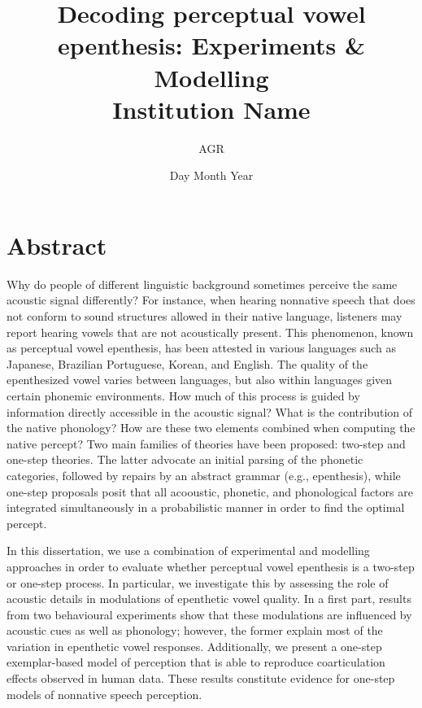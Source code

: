\documentclass[12pt, twoside]{report}
\title{
	{Decoding perceptual vowel epenthesis: Experiments \& Modelling}\\
	{\large Institution Name}\\
}
\author{AGR}
\date{Day Month Year}
\begin{document}
\maketitle

\chapter*{Abstract}
Why do people of different linguistic background sometimes perceive the same acoustic signal differently? For instance, when hearing nonnative speech that does not conform to sound structures allowed in their native language, listeners may report hearing vowels that are not acoustically present. This phenomenon, known as perceptual vowel epenthesis, has been attested in various languages such as Japanese, Brazilian Portuguese, Korean, and English. The quality of the epenthesized vowel varies between languages, but also within languages given certain phonemic environments. 
How much of this process is guided by information directly accessible in the acoustic signal? What is the contribution of the native phonology? How are these two elements combined when computing the native percept? Two main families of theories have been proposed: two-step and one-step theories. The latter advocate an initial parsing of the phonetic categories, followed by repairs by an abstract grammar (e.g., epenthesis), while one-step proposals posit that all acooustic, phonetic, and phonological factors are integrated simultaneously in a probabilistic manner in order to find the optimal percept.  

In this dissertation, we use a combination of experimental and modelling approaches in order to evaluate whether perceptual vowel epenthesis is a two-step or one-step process. In particular, we investigate this by assessing the role of acoustic details in modulations of epenthetic vowel quality. In a first part, results from two behavioural experiments show that these modulations are influenced by acoustic cues as well as phonology; however, the former explain most of the variation in epenthetic vowel responses. Additionally, we present a one-step exemplar-based model of perception that is able to reproduce coarticulation effects observed in human data. These results constitute evidence for one-step models of nonnative speech perception.
\end{document}
